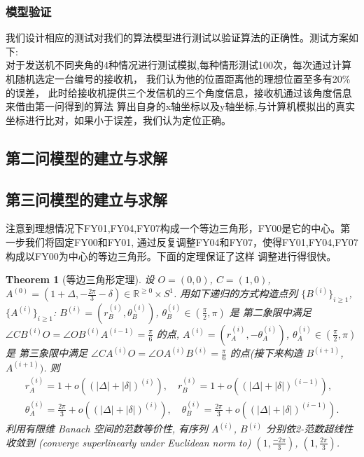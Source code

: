 \documentclass{my_paper}
\newcommand{\R}{\mathbb{R}}
\newtheorem{theorem}{Theorem}
\begin{document}
\subsubsection{模型验证}
我们设计相应的测试对我们的算法模型进行测试以验证算法的正确性。测试方案如下:\\
对于发送机不同夹角的4种情况进行测试模拟,每种情形测试100次，每次通过计算机随机选定一台编号的接收机，
我们认为他的位置距离他的理想位置至多有20\%的误差，
此时给接收机提供三个发信机的三个角度信息，接收机通过该角度信息来借由第一问得到的算法
算出自身的x轴坐标以及y轴坐标,与计算机模拟出的真实坐标进行比对，如果小于误差，我们认为定位正确。



\subsection{第二问模型的建立与求解}

\subsection{第三问模型的建立与求解}
    注意到理想情况下FY01,FY04,FY07构成一个等边三角形，FY00是它的中心。第一步我们将固定FY00和FY01,
    通过反复调整FY04和FY07，使得FY01,FY04,FY07构成以FY00为中心的等边三角形。下面的定理保证了这样
    调整进行得很快。
\begin{theorem}[等边三角形定理]
\label{dbsjx} 
    设 $O=(0,0)$, $C=(1,0)$,   
    $A^{(0)}=(1+\Delta,-\frac{2\pi}3-\delta)\in \R^{\geq 0}\times S^1$. 用如下递归的方式构造点列
    $\{B^{(i)}\}_{i\geq 1}$, $\{A^{(i)}\}_{i\geq 1}$: 
    $B^{(i)}=(r_B^{(i)},\theta_B^{(i)})$, $\theta_{B}^{(i)}\in (\frac \pi 2,\pi)$ 是
    第二象限中满足 $\angle CB^{(i)}O=\angle OB^{(i)}A^{(i-1)}=\frac\pi6$ 的点, 
    $A^{(i)}=(r_A^{(i)},-\theta_A^{(i)})$, $\theta_{A}^{(i)}\in (\frac \pi 2,\pi)$ 是
    第三象限中满足 $\angle CA^{(i)}O=\angle OA^{(i)}B^{(i)}=\frac\pi6$ 的点(接下来构造 $B^{(i+1)}$, $A^{(i+1)})$. 
    则 
    \begin{equation}
    \begin{aligned}
        r_A^{(i)}=1+o((|\Delta|+|\delta|)^{(i)}),\quad r_B^{(i)}=1+o((|\Delta|+|\delta|)^{(i-1)}),
        \\
        \theta_A^{(i)}=\frac{2\pi}{3}+o((|\Delta|+|\delta|)^{(i)}),\quad \theta_B^{(i)}=\frac{2\pi}{3}+o((|\Delta|+|\delta|)^{(i-1)}).
    \end{aligned}
    \label{1}
    \end{equation}
    利用有限维 Banach 空间的范数等价性, 有序列 $A^{(i)}$, $B^{(i)}$ 分别依2-范数超线性收敛到
    (converge superlinearly under Euclidean norm to) $(1,\frac{-2\pi}3)$, $(1,\frac{2\pi}3)$.
\end{theorem} 
\end{document}
